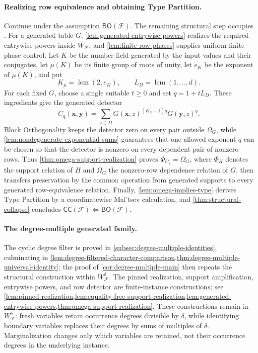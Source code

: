 \documentclass[11pt]{article}
\theoremstyle{plain}
\theoremstyle{definition}
\theoremstyle{remark}
\newcommand{\cF}{\mathcal F}
\newcommand{\CC}{\mathsf{CC}}
\newcommand{\BO}{\mathsf{BO}}
\newcommand{\WFdeg}[1]{W_{\cF}^{#1}}
\newcommand{\SuppRel}[1]{\Phi_{#1}}
\newcommand{\RowEq}[1]{\Omega_{#1}}
\DeclareMathOperator{\lcm}{lcm}
\begin{document}
\paragraph{Realizing row equivalence and obtaining Type Partition.}
Continue under the assumption $\BO(\cF)$.  The remaining structural step
occupies
.  For a generated table
$G$, \cref{lem:generated-entrywise-powers} realizes the required entrywise
powers inside $W_{\cF}$, and \cref{lem:finite-row-phases} supplies uniform
finite phase control.  Let $K$ be the number field generated by the input
values and their conjugates, let $\mu(K)$ be its finite group of roots of
unity, let $e_K$ be the exponent of $\mu(K)$, and put
\[
  K_\mu=\lcm(2,e_K),
  \qquad L_D=\lcm(1,\ldots,d).
\]
For each fixed $G$, choose a single suitable $t\ge0$ and set
$q=1+tL_D$.  These ingredients give the generated detector
\begin{equation*}
  C_q(\mathbf x,\mathbf y)
  =\sum_{z\in D}
      G(\mathbf x,z)^{(K_\mu-1)q}G(\mathbf y,z)^q.
\end{equation*}
Block Orthogonality keeps the detector zero on every pair outside
$\RowEq G$, while \cref{lem:nondegenerate-exponential-sums} guarantees that
one allowed exponent $q$ can be chosen so that the detector is nonzero on
every dependent pair of nonzero rows.  Thus
\cref{thm:omega-support-realization} proves
$\SuppRel{C_q}=\RowEq G$, where $\SuppRel H$ denotes the support relation of
$H$ and $\RowEq G$ the nonzero-row dependence relation of $G$.
 then transfers preservation by the common
operation from generated supports to every generated row-equivalence
relation.  Finally, \cref{lem:omega-implies-type} derives Type Partition by
a coordinatewise Mal'tsev calculation, and
\cref{thm:structural-collapse} concludes
$\CC(\cF)\Longleftrightarrow\BO(\cF)$.

\paragraph{The degree-multiple generated family.}
The cyclic degree filter is proved in
\cref{subsec:degree-multiple-identities}, culminating in
\cref{lem:degree-filtered-character-comparison,thm:degree-multiple-universal-identity};
the proof of \cref{cor:degree-multiple-main} then repeats the structural
construction within $\WFdeg{\delta}$.  The pinned realization, support
amplification, entrywise powers, and row detector are finite-instance
constructions; see
\cref{lem:pinned-realization,lem:equality-free-support-realization,lem:generated-entrywise-powers,thm:omega-support-realization}.
These constructions remain in $\WFdeg{\delta}$: fresh variables retain
occurrence degrees divisible by $\delta$, while identifying boundary
variables replaces their degrees by sums of multiples of $\delta$.
Marginalization changes only which variables are retained, not their
occurrence degrees in the underlying instance.
\end{document}
